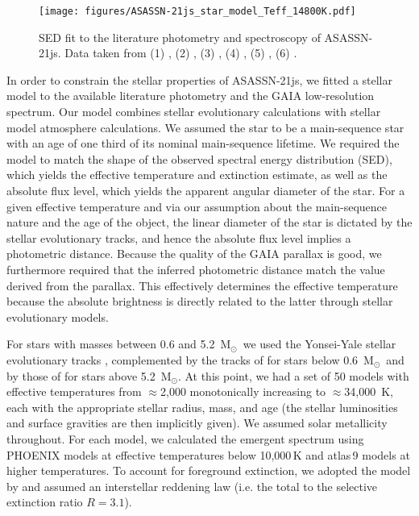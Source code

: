 \documentclass[letter]{aa} %
\begin{document}
\begin{figure}
    \hspace{-2mm}
    \texttt{[image: figures/ASASSN-21js\_star\_model\_Teff\_14800K.pdf]}
    \caption{SED fit to the literature photometry and spectroscopy of ASASSN-21js. Data taken from (1) \cite{2014MNRAS.440.2036D}, (2) \cite{2002A&A...395..347E}, (3) \cite{2006AJ....131.1163S}, (4) \cite{2003PASP..115..953B,2009PASP..121..213C}, (5) \citet[][submitted to PASA]{2024arXiv240202015O}, (6) \cite{2023A&A...674A...1G}.}
    \label{fig:stellar_SED_fit}
\end{figure}


\newcommand{\Msun}{M$_\odot$}
\newcommand{\Teff}{$T_{\rm{eff}}$}
\newcommand{\Av}{$A_{\rm{V}}$}

In order to constrain the stellar properties of ASASSN-21js, we fitted a stellar model to the available literature photometry and the GAIA low-resolution spectrum.
%
Our model combines stellar evolutionary calculations with stellar model atmosphere calculations.
%
We assumed the star to be a main-sequence star with an age of one third of its nominal main-sequence lifetime.
%
We required the model to match the shape of the observed spectral energy distribution (SED), which yields the effective temperature and extinction estimate, as well as the absolute flux level, which yields the apparent angular diameter of the star.
%
For a given effective temperature and via our assumption about the main-sequence nature and the age of the object, the linear diameter of the star is dictated by the stellar evolutionary tracks, and hence the absolute flux level implies a photometric distance.
%
Because the quality of the GAIA parallax is good, we furthermore required that the inferred photometric distance match the value derived from the parallax. This effectively determines the effective temperature because the absolute brightness is directly related to the latter through stellar evolutionary models.

For stars with masses between 0.6 and 5.2~\Msun\, we used the Yonsei-Yale stellar evolutionary tracks \citep{2001ApJS..136..417Y,2002ApJS..143..499K,2003ApJS..144..259Y,2004ApJS..155..667D}, complemented by the tracks of \cite{1998A&A...337..403B} for stars below 0.6~\Msun \ and by those of \cite{2002A&A...391..195G} for stars above 5.2~\Msun.
%
At this point, we had a set of 50 models with effective temperatures from $\approx$2,000 monotonically increasing to $\approx$34,000~K, each with the appropriate stellar radius, mass, and age (the stellar luminosities and surface gravities are then implicitly given). We assumed solar metallicity throughout.
%
For each model, we calculated the emergent spectrum using PHOENIX models \citep{1997ApJ...483..390H,2013A&A...553A...6H} at effective temperatures below 10,000\,K and {\sc atlas\,9} models \citep{Kurucz1979,1992IAUS..149..225K,1994KurCD..19.....K} at higher temperatures.
%
To account for foreground extinction, we adopted the model by \cite{1989ApJ...345..245C} and assumed an interstellar reddening law (i.e. the total to the selective extinction ratio $R=3.1$).
\end{document}
